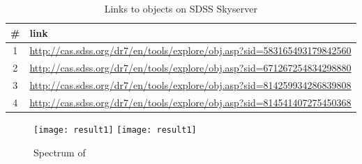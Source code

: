 \begin{table}[ht]
  \small
     \begin{tabular}[ht]{c l}
       \toprule
     \# & link \\
   \midrule
   1& \url{http://cas.sdss.org/dr7/en/tools/explore/obj.asp?sid=583165493179842560} \\   
   2& \url{http://cas.sdss.org/dr7/en/tools/explore/obj.asp?sid=671267254834298880}\\ 
   3& \url{http://cas.sdss.org/dr7/en/tools/explore/obj.asp?sid=814259934286839808}\\ 
   4& \url{http://cas.sdss.org/dr7/en/tools/explore/obj.asp?sid=814541407275450368}\\ 
   \bottomrule
   \end{tabular}
  \caption{Links to objects on SDSS Skyserver}
  \label{tab:Links}
\end{table}





   \begin{figure}[!htbp]
      \begin{center}
        \leavevmode
        \ifpdf
        \texttt{[image: result1]}
        \else
        \texttt{[image: result1]}
        \fi
        \caption{Spectrum of }
        
        \label{FigResult1}
      \end{center}
    \end{figure}

